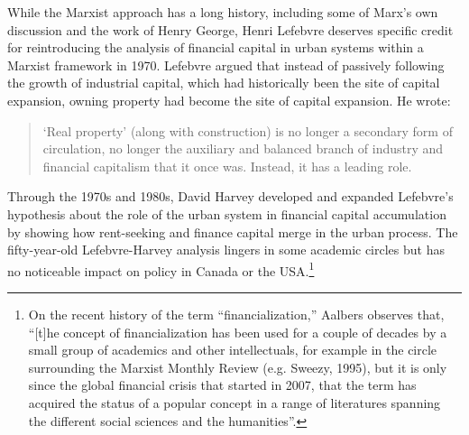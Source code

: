 While the Marxist approach has a long history, including some of Marx's own discussion and the work of Henry George,  Henri Lefebvre%
\cite{lefebvreRevolutionUrbaine1970, lefebvreUrbanRevolution2003}  deserves specific credit for  reintroducing the analysis of financial capital in urban systems within a Marxist framework in 1970. Lefebvre argued that instead of passively following the growth of industrial capital, which had historically been the site of capital expansion,  owning property had become the site of capital expansion.  He wrote:
\begin{quotation}
\noindent ‘Real property’ (along with construction) is no longer a secondary form of circulation, no longer the auxiliary and balanced branch of industry and financial capitalism that it once was. Instead, it has a leading role. 
\end{quotation}

Through the 1970s and 1980s, David Harvey \cite{harveyClassmonopolyRentFinance1974} developed and expanded Lefebvre’s hypothesis about the role of the urban system in financial capital accumulation by showing how rent-seeking and finance capital merge in the urban process. The fifty-year-old Lefebvre-Harvey analysis lingers in some academic circles but has no noticeable impact on policy in Canada or the USA.\footnote{On the recent history of the term ``financialization,'' Aalbers observes that, ``[t]he concept of financialization has been used for a couple of decades by a small group of academics and other intellectuals, for example in the circle surrounding the Marxist Monthly Review (e.g. Sweezy, 1995), but it is only since the global financial crisis that started in 2007, that the term has acquired the status of a popular concept in a range of literatures spanning the different social sciences and the humanities''\cite{aalbersVariegatedFinancializationHousing2017}.}  












